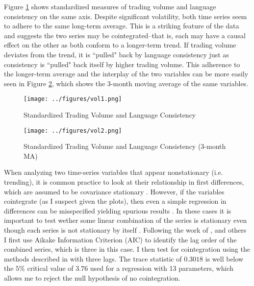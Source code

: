 Figure \ref{vol1} shows standardized measures of trading volume and language consistency on the same axis. Despite significant volatility, both time series seem to adhere to the same long-term average. This is a striking feature of the data and suggests the two series may be cointegrated--that is, each may have a causal effect on the other as both conform to a longer-term trend. If trading volume deviates from the trend, it is ``pulled" back by language consistency just as consistency is ``pulled" back itself by higher trading volume. This adherence to the longer-term average and the interplay of the two variables can be more easily seen in Figure \ref{vol2}, which shows the 3-month moving average of the same variables. 


\begin{figure}
\begin{center}
\texttt{[image: ../figures/vol1.png]}
\caption[Std. Trading Volume and Language Consistency]{Standardized Trading Volume and Language Consistency\label{vol1}}
\end{center}
\end{figure}

\begin{figure}
\begin{center}
\texttt{[image: ../figures/vol2.png]}
\caption[Std. Trading Volume and Language Consistency (3-mos. MA)]{Standardized Trading Volume and Language Consistency (3-month MA)\label{vol2}}
\end{center}
\end{figure}

When analyzing two time-series variables that appear nonstationary (i.e. trending), it is common practice to look at their relationship in first differences, which are assumed to be covariance stationary \citep{phillips1988}. However, if the variables cointegrate (as I suspect given the plots), then even a simple regression in differences can be misspecified yielding spurious results \citep{granger1974}. In these cases it is important to test wether some linear combination of the series is stationary even though each series is not stationary by itself \citep{engle1987, johansen1988}. Following the work of \citet{trusov2009}, \citet{xiong2013} and others I first use Aikake Information Criterion (AIC) to identify the lag order of the combined series, which is three in this case. I then test for cointegration using the methods described in \citet{johansen1988, johansen1995} with three lags. The trace statistic of $0.3018$ is well below the $5\%$ critical value of $3.76$ used for a regression with 13 parameters, which allows me to reject the null hypothesis of no cointegration.

